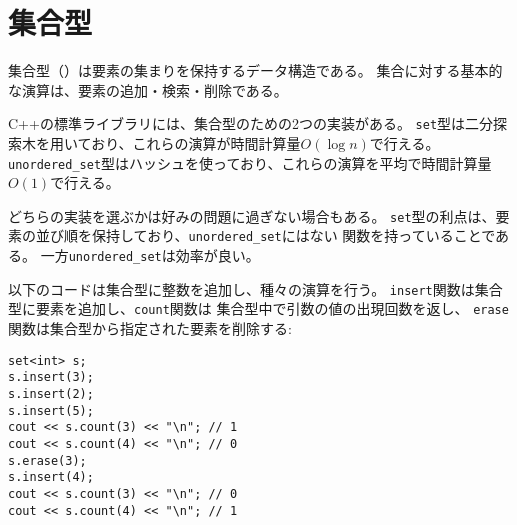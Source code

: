 \section{集合型}


集合型（）は要素の集まりを保持するデータ構造である。
集合に対する基本的な演算は、要素の追加・検索・削除である。

C++の標準ライブラリには、集合型のための2つの実装がある。
\texttt{set}型は二分探索木を用いており、これらの演算が時間計算量$O(\log n)$で行える。
\texttt{unordered\_set}型はハッシュを使っており、これらの演算を平均で時間計算量$O(1)$で行える。

\begin{comment}
The choice of which set implementation to use
is often a matter of taste.
The benefit of the \texttt{set} structure
is that it maintains the order of the elements
and provides functions that are not available
in \texttt{unordered\_set}.
On the other hand, \texttt{unordered\_set}
can be more efficient.

The following code creates a set
that contains integers,
and shows some of the operations.
The function \texttt{insert} adds an element to the set,
the function \texttt{count} returns the number of occurrences
of an element in the set,
and the function \texttt{erase} removes an element from the set.
\end{comment}

どちらの実装を選ぶかは好みの問題に過ぎない場合もある。
\texttt{set}型の利点は、要素の並び順を保持しており、\texttt{unordered\_set}にはない
関数を持っていることである。
一方\texttt{unordered\_set}は効率が良い。

以下のコードは集合型に整数を追加し、種々の演算を行う。
\texttt{insert}関数は集合型に要素を追加し、\texttt{count}関数は
集合型中で引数の値の出現回数を返し、
\texttt{erase}関数は集合型から指定された要素を削除する:

\begin{lstlisting}
set<int> s;
s.insert(3);
s.insert(2);
s.insert(5);
cout << s.count(3) << "\n"; // 1
cout << s.count(4) << "\n"; // 0
s.erase(3);
s.insert(4);
cout << s.count(3) << "\n"; // 0
cout << s.count(4) << "\n"; // 1
\end{lstlisting}

\begin{comment}
A set can be used mostly like a vector,
but it is not possible to access
the elements using the \texttt{[]} notation.
The following code creates a set,
prints the number of elements in it, and then
iterates through all the elements:
\end{comment}

